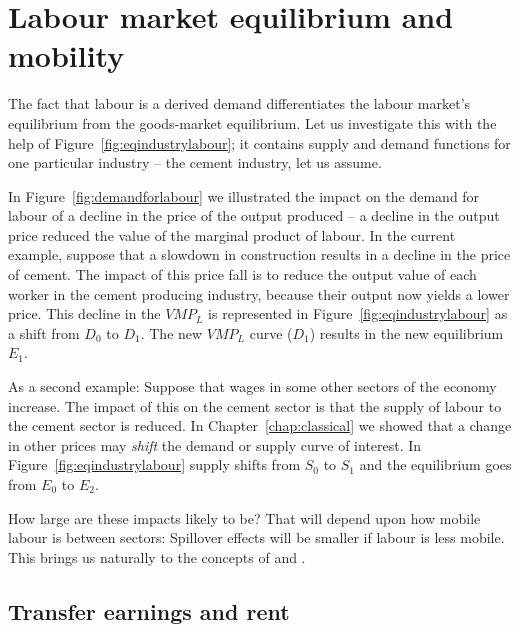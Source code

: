 \section{Labour market equilibrium and mobility}\label{sec:ch12sec3}

The fact that labour is a derived demand differentiates the labour market's
equilibrium from the goods-market equilibrium. Let us investigate this with
the help of Figure~\ref{fig:eqindustrylabour}; it contains supply and demand
functions for one particular industry -- the cement industry, let us assume.

In Figure~\ref{fig:demandforlabour} we illustrated the impact on the demand
for labour of a decline in the price of the output produced -- a decline in
the output price reduced the value of the marginal product of labour. In the
current example, suppose that a slowdown in construction results in a
decline in the price of cement. The impact of this price fall is to reduce
the output value of each worker in the cement producing industry, because
their output now yields a lower price. This decline in the $VMP_{L}$ is
represented in Figure~\ref{fig:eqindustrylabour} as a shift from $D_{0}$ to 
$D_{1}$. The new $VMP_{L}$ curve ($D_{1}$) results in the new equilibrium 
$E_{1}$.



\newhtmlpage



As a second example: Suppose that wages in some other sectors of the economy
increase. The impact of this on the cement sector is that the supply of
labour to the cement sector is reduced. In Chapter~\ref{chap:classical} we showed that a change
in other prices may \textit{shift} the demand or supply curve of interest.
In Figure~\ref{fig:eqindustrylabour} supply shifts from $S_{0}$ to $S_{1}$
and the equilibrium goes from $E_{0}$ to $E_{2}$.

How large are these impacts likely to be? That will depend upon how mobile
labour is between sectors: Spillover effects will be smaller if labour is
less mobile. This brings us naturally to the concepts of %
 and .

\newhtmlpage

\subsection*{Transfer earnings and rent}

